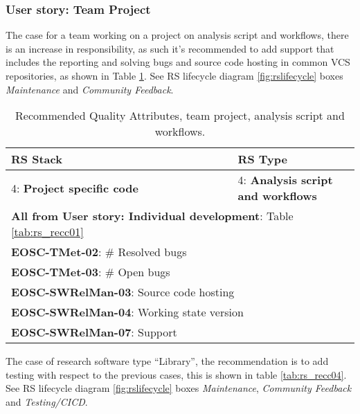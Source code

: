 \subsubsection{User story: Team Project}

The case for a team working on a project on analysis script and workflows, there is an increase in responsibility, as such it's recommended to add support that includes the reporting and solving bugs and source code hosting in common VCS repositories, as shown in Table \ref{tab:rs_recc03}. See RS lifecycle diagram \ref{fig:rslifecycle} boxes \textit{Maintenance} and \textit{Community Feedback}.

\begin{center}
\begin{table}[h]
  \small
  \begin{tabular}{|p{0.65\linewidth}|p{0.35\linewidth}|} \hline

    \textbf{RS Stack} & \textbf{RS Type} \\ \hline \hline
    4: \textbf{Project specific code} &
    4: \textbf{Analysis script and workflows} \\ \hline \hline
    \multicolumn{2}{|l|}{\textbf{All from User story: Individual development}: Table \ref{tab:rs_recc01}} \\ \hline
    \multicolumn{2}{|l|}{\textbf{EOSC-TMet-02}: \# Resolved bugs} \\ \hline
    \multicolumn{2}{|l|}{\textbf{EOSC-TMet-03}: \# Open bugs} \\ \hline
    \multicolumn{2}{|l|}{\textbf{EOSC-SWRelMan-03}: Source code hosting} \\ \hline
    \multicolumn{2}{|l|}{\textbf{EOSC-SWRelMan-04}: Working state version} \\ \hline
    \multicolumn{2}{|l|}{\textbf{EOSC-SWRelMan-07}: Support} \\ \hline

  \end{tabular}
  \caption{Recommended Quality Attributes, team project, analysis script and workflows.}
  \label{tab:rs_recc03}
\end{table}
\end{center}

The case of research software type ``Library'', the recommendation is to add testing with respect to the previous cases, this is shown in table \ref{tab:rs_recc04}.
See RS lifecycle diagram \ref{fig:rslifecycle} boxes \textit{Maintenance}, \textit{Community Feedback} and \textit{Testing/CICD}.


